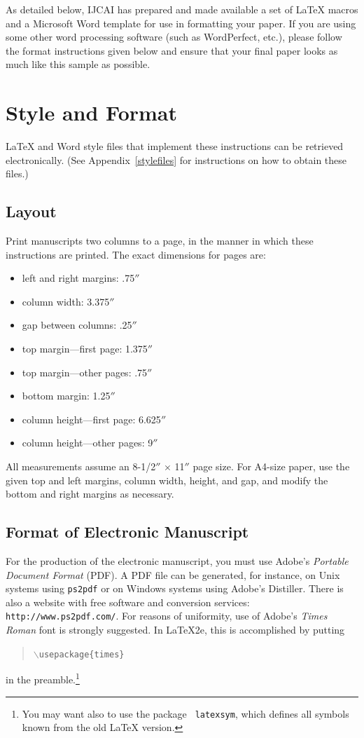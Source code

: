 \documentclass{article}
\begin{document}
As detailed below, IJCAI has prepared and made available a set of
\LaTeX{} macros and a Microsoft Word template for use in formatting
your paper. If you are using some other word processing software (such
as WordPerfect, etc.), please follow the format instructions given
below and ensure that your final paper looks as much like this sample
as possible.

\section{Style and Format}

\LaTeX{} and Word style files that implement these instructions
can be retrieved electronically. (See Appendix~\ref{stylefiles} for
instructions on how to obtain these files.)

\subsection{Layout}

Print manuscripts two columns to a page, in the manner in which these
instructions are printed. The exact dimensions for pages are:
\begin{itemize}
\item left and right margins: .75$''$
\item column width: 3.375$''$
\item gap between columns: .25$''$
\item top margin---first page: 1.375$''$
\item top margin---other pages: .75$''$
\item bottom margin: 1.25$''$
\item column height---first page: 6.625$''$
\item column height---other pages: 9$''$
\end{itemize}

All measurements assume an 8-1/2$''$ $\times$ 11$''$ page size. For
A4-size paper, use the given top and left margins, column width,
height, and gap, and modify the bottom and right margins as necessary.

\subsection{Format of Electronic Manuscript}

For the production of the electronic manuscript, you must use Adobe's
{\em Portable Document Format} (PDF). A PDF file can be generated, for
instance, on Unix systems using {\tt ps2pdf} or on Windows systems
using Adobe's Distiller. There is also a website with free software
and conversion services: {\tt http://www.ps2pdf.com/}. For reasons of
uniformity, use of Adobe's {\em Times Roman} font is strongly suggested. In
\LaTeX2e{}, this is accomplished by putting
\begin{quote} 
\mbox{\tt $\backslash$usepackage\{times\}}
\end{quote}
in the preamble.\footnote{You may want also to use the package {\tt
latexsym}, which defines all symbols known from the old \LaTeX{}
version.}
  
\end{document}

